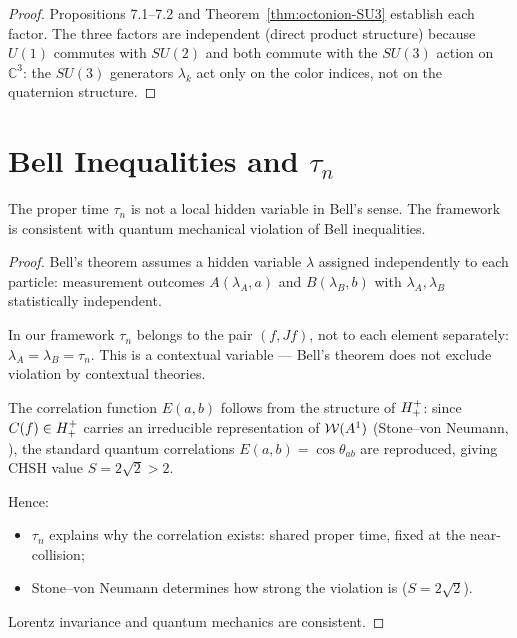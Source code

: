\begin{proof}
Propositions 7.1--7.2 and Theorem~\ref{thm:octonion-SU3} establish each
factor.
The three factors are independent (direct product structure) because
$U(1)$ commutes with $SU(2)$ and both commute with the $SU(3)$ action
on $\mathbb{C}^3$: the $SU(3)$ generators $\lambda_k$ act only on the
color indices, not on the quaternion structure.
\end{proof}


\section{Bell Inequalities and \texorpdfstring{$\tau_n$}{tau_n}}
\label{sec:bell}

\begin{theorem}
\label{thm:bell-consistency}
The proper time $\tau_n$ is not a local hidden variable in Bell's sense.
The framework is consistent with quantum mechanical violation of Bell
inequalities.
\begin{proof}
Bell's theorem assumes a hidden variable $\lambda$ assigned independently
to each particle: measurement outcomes $A(\lambda_A,a)$ and
$B(\lambda_B,b)$ with $\lambda_A,\lambda_B$ statistically independent.

In our framework $\tau_n$ belongs to the pair $(f,Jf)$, not to each
element separately: $\lambda_A=\lambda_B=\tau_n$.
This is a contextual variable --- Bell's theorem does not exclude
violation by contextual theories.

The correlation function $E(a,b)$ follows from the structure of
$H^+_+$: since $C(f)\in H^+_+$ carries an irreducible
representation of $\mathcal{W}(A^1)$ (Stone--von Neumann, \cite{brendecke2026rh}),
the standard quantum correlations $E(a,b)=\cos\theta_{ab}$ are
reproduced, giving CHSH value $S=2\sqrt{2}>2$.

Hence:
\begin{itemize}
  \item $\tau_n$ explains why the correlation exists: shared proper time,
        fixed at the near-collision;
  \item Stone--von Neumann determines how strong the violation is
        ($S=2\sqrt{2}$).
\end{itemize}
Lorentz invariance and quantum mechanics are consistent.
\end{proof}
\end{theorem}

